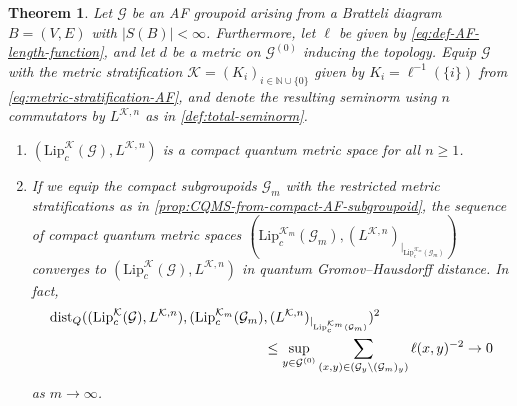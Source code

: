 \documentclass[11pt,a4paper,oneside,final,reqno]{amsart}
\newtheorem{theorem}[lemma]{Theorem}
\theoremstyle{definition}
\newcommand{\G}{\mathcal{G}}
\newcommand{\Go}{\mathcal{G}^{(0)}}
\newcommand{\cK}{\mathcal{K}}
\newcommand{\Lip}{\mathrm{Lip}}
\newcommand{\N}{\mathbb{N}}
\numberwithin{equation}{section}
\begin{document}
	\begin{theorem}\label{thm:CQMS-from-AF-groupoids}
		Let $\G$ be an AF groupoid arising from a Bratteli diagram $B = (V,E)$ with $\vert S(B)\vert < \infty$. Furthermore, let $\ell$ be given by \eqref{eq:def-AF-length-function}, and let $d$ be a metric on $\Go$ inducing the topology. 
		Equip $\G$ with the metric stratification $\cK = (K_i)_{i \in \N \cup \{0\}}$ given by $K_i = \ell^{-1}(\{i\})$ from \eqref{eq:metric-stratification-AF}, and denote the resulting seminorm using $n$ commutators by $L^{\cK, n}$ as in \cref{def:total-seminorm}.
		\begin{enumerate} 
			\item $(\Lip_c^{\cK}(\G), L^{\cK, n})$ 
			is a compact quantum metric space for all $n \geq 1$.
			\item If we equip the compact subgroupoids $\G_m$ with the restricted metric stratifications as in \cref{prop:CQMS-from-compact-AF-subgroupoid}, the sequence of compact quantum metric spaces $(\Lip_c^{\cK_m}(\G_m), (L^{\cK, n})_{\vert_{\Lip_c^{\cK_m}(\G_m)}})$ converges to  
			$(\Lip_c^{\cK}(\G), L^{\cK, n})$
			in quantum Gromov--Hausdorff distance. In fact, 
			\begin{align}\label{eq:rate-of-qGH-convergence}
				\mathrm{dist}_Q (( \Lip_c^{\cK}(\G), L^{\cK, n}), (\Lip_c^{\cK_m}(\G_m)&,(L^{\cK, n})_{\vert_{\Lip_c^{\cK_m}(\G_m)}})^2 \notag \\
				&\leq \sup_{y \in \Go} \sum_{(x,y) \in (\G_y \setminus (\G_m)_y )} \ell(x,y)^{-2} \to 0
			\end{align}
			as $m \to \infty$. 
		\end{enumerate}
	\end{theorem}
	
\end{document}
